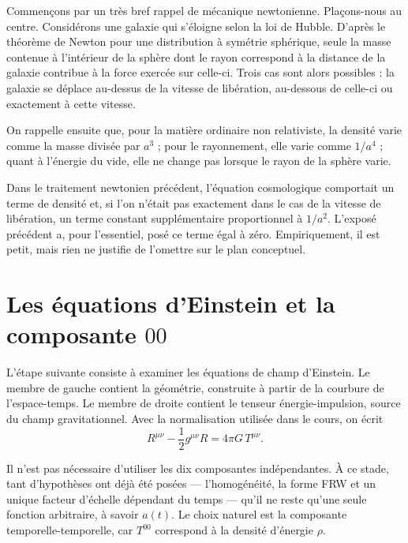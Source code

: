 Commençons par un très bref rappel de mécanique newtonienne. Plaçons-nous au centre. Considérons une galaxie qui s’éloigne selon la loi de Hubble. D’après le théorème de Newton pour une distribution à symétrie sphérique, seule la masse contenue à l’intérieur de la sphère dont le rayon correspond à la distance de la galaxie contribue à la force exercée sur celle-ci. Trois cas sont alors possibles : la galaxie se déplace au-dessus de la vitesse de libération, au-dessous de celle-ci ou exactement à cette vitesse.

On rappelle ensuite que, pour la matière ordinaire non relativiste, la densité varie comme la masse divisée par \(a^3\) ; pour le rayonnement, elle varie comme \(1/a^4\) ; quant à l’énergie du vide, elle ne change pas lorsque le rayon de la sphère varie.

Dans le traitement newtonien précédent, l’équation cosmologique comportait un terme de densité et, si l’on n’était pas exactement dans le cas de la vitesse de libération, un terme constant supplémentaire proportionnel à \(1/a^2\). L’exposé précédent a, pour l’essentiel, posé ce terme égal à zéro. Empiriquement, il est petit, mais rien ne justifie de l’omettre sur le plan conceptuel.

\section{Les équations d’Einstein et la composante \(00\)}

L’étape suivante consiste à examiner les équations de champ d’Einstein. Le membre de gauche contient la géométrie, construite à partir de la courbure de l’espace-temps. Le membre de droite contient le tenseur énergie-impulsion, source du champ gravitationnel. Avec la normalisation utilisée dans le cours, on écrit
\begin{equation}
R^{\mu\nu}-\frac{1}{2}g^{\mu\nu}R=4\pi G\,T^{\mu\nu}.
\end{equation}

Il n’est pas nécessaire d’utiliser les dix composantes indépendantes. À ce stade, tant d’hypothèses ont déjà été posées --- l’homogénéité, la forme FRW et un unique facteur d’échelle dépendant du temps --- qu’il ne reste qu’une seule fonction arbitraire, à savoir \(a(t)\). Le choix naturel est la composante temporelle-temporelle, car \(T^{00}\) correspond à la densité d’énergie \(\rho\).

